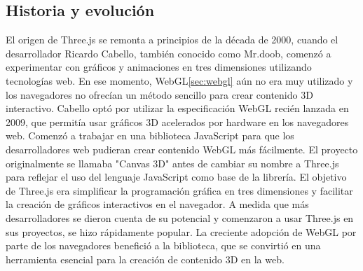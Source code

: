\documentclass[a4paper, 11pt]{book}
\begin{document}
\subsection{Historia y evolución}
El origen de Three.js se remonta a principios de la década de 2000, cuando el desarrollador Ricardo Cabello, también conocido como Mr.doob, comenzó a experimentar con gráficos y animaciones en tres dimensiones utilizando tecnologías web. En ese momento, WebGL\ref{sec:webgl} aún no era muy utilizado y los navegadores no ofrecían un método sencillo para crear contenido 3D interactivo.
Cabello optó por utilizar la especificación WebGL recién lanzada en 2009, que permitía usar gráficos 3D acelerados por hardware en los navegadores web. Comenzó a trabajar en una biblioteca JavaScript para que los desarrolladores web pudieran crear contenido WebGL más fácilmente.
El proyecto originalmente se llamaba "Canvas 3D" antes de cambiar su nombre a Three.js para reflejar el uso del lenguaje JavaScript como base de la librería.
El objetivo de Three.js era simplificar la programación gráfica en tres dimensiones y facilitar la creación de gráficos interactivos en el navegador.
A medida que más desarrolladores se dieron cuenta de su potencial y comenzaron a usar Three.js en sus proyectos, se hizo rápidamente popular. La creciente adopción de WebGL por parte de los navegadores benefició a la biblioteca, que se convirtió en una herramienta esencial para la creación de contenido 3D en la web.
\end{document}
